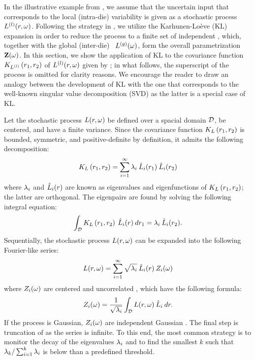 In the illustrative example from , we assume that the uncertain input that corresponds to the local (intra-die) variability is given as a stochastic process $L^{(l)}(r, \omega)$. Following the strategy in , we utilize the Karhunen-Lo\`{e}ve (KL) expansion in order to reduce the process to a finite set of independent \rvs, which, together with the global (inter-die) \rv\ ${L^{(g)}}(\omega)$, form the overall parametrization $\mathbf{Z}(\omega)$. In this section, we show the application of KL to the covariance function $K_{L^{(l)}}\left(r_1, r_2\right)$ of $L^{(l)}(r, \omega)$ given by  \cite{maitre2010, ghanem1991, ghanta2006}; in what follows, the superscript of the process is omitted for clarity reasons. We encourage the reader to draw an analogy between the development of KL with the one that corresponds to the well-known singular value decomposition (SVD) as the latter is a special case of KL.

Let the stochastic process $L(r, \omega)$ be defined over a spacial domain $\mathcal{D}$, be centered, and have a finite variance. Since the covariance function $K_{L}\left(r_1, r_2\right)$ is bounded, symmetric, and positive-definite by definition, it admits the following decomposition:
\[
  K_{L}\left(r_1, r_2\right) = \sum_{i = 1}^\infty \lambda_i \: \hat{L}_i(r_1) \: \hat{L}_i(r_2)
\]
where $\lambda_i$ and $\hat{L}_i(r)$ are known as eigenvalues and eigenfunctions of $K_{L}\left(r_1, r_2\right)$; the latter are orthogonal. The eigenpairs are found by solving the following integral equation:
\begin{equation} \elabel{kl-eigenpairs}
  \int_\domain \fCov{\Leff}{r_1, r_2} \: \klf{\Leff}_i (r) \: dr_1 = \klv_i \: \klf{\Leff}_i(r_2).
\end{equation}
Sequentially, the stochastic process $L(r, \omega)$ can be expanded into the following Fourier-like series:
\begin{equation} \elabel{kl-expansion}
  \Leff(r, \o) = \sum_{i = 1}^\infty \sqrt{\lambda_i} \: \pcc{\Leff}_i(r) \: \Z_i(\o)
\end{equation}
where $Z_i(\omega)$ are centered and uncorrelated \rvs, which have the following formula:
\[
  Z_i(\omega) = \frac{1}{\sqrt{\lambda_i}} \int_{\mathcal{D}} L(r, \omega) \: \hat{L}_i \: dr.
\]
If the process is Gaussian, $Z_i(\omega)$ are independent Gaussian \rvs. The final step is truncation of  as the series is infinite. To this end, the most common strategy is to monitor the decay of the eigenvalues $\lambda_i$ and to find the smallest $k$ such that $\lambda_k / \sum_{i = 1}^k \lambda_i$ is below than a predefined threshold.

